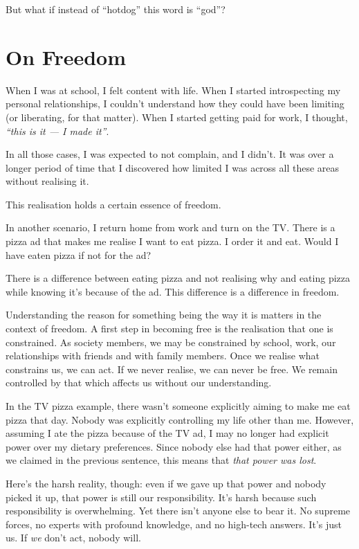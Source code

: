 But what if instead of “hotdog” this word is “god”?

\chapter{On Freedom}

\clearpage

When I was at school, I felt content with life. When I started introspecting my personal relationships, I couldn’t understand how they could have been limiting (or liberating, for that matter). When I started getting paid for work, I thought, \emph{“this is it — I made it”}.

In all those cases, I was expected to not complain, and I didn’t. It was over a longer period of time that I discovered how limited I was across all these areas without realising it.

This realisation holds a certain essence of freedom.

In another scenario, I return home from work and turn on the TV. There is a pizza ad that makes me realise I want to eat pizza. I order it and eat. Would I have eaten pizza if not for the ad?

There is a difference between eating pizza and not realising why and eating pizza while knowing it’s because of the ad. This difference is a difference in freedom.

Understanding the reason for something being the way it is matters in the context of freedom. A first step in becoming free is the realisation that one is constrained. As society members, we may be constrained by school, work, our relationships with friends and with family members. Once we realise what constrains us, we can act. If we never realise, we can never be free. We remain controlled by that which affects us without our understanding.

In the TV pizza example, there wasn’t someone explicitly aiming to make me eat pizza that day. Nobody was explicitly controlling my life other than me. However, assuming I ate the pizza because of the TV ad, I may no longer had explicit power over my dietary preferences. Since nobody else had that power either, as we claimed in the previous sentence, this means that \emph{that power was lost}.

Here’s the harsh reality, though: even if we gave up that power and nobody picked it up, that power is still our responsibility. It’s harsh because such responsibility is overwhelming. Yet there isn’t anyone else to bear it. No supreme forces, no experts with profound knowledge, and no high-tech answers. It’s just us. If \emph{we} don’t act, nobody will.
